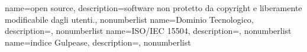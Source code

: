 {
	name={open source},
	description={software non protetto da copyright e liberamente modificabile dagli utenti.},
	nonumberlist
}
{
name={Dominio Tecnologico},
description={},
nonumberlist
}
{
name={ISO/IEC 15504},
description={},
nonumberlist
}
{
name={indice Gulpease},
description={},
nonumberlist
}